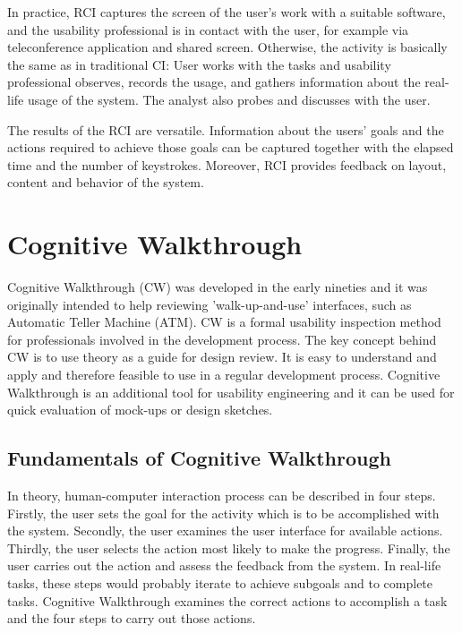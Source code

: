 \documentclass[12pt,a4paper,oneside,pdftex]{report}
\begin{document}
In practice, RCI captures the screen of the user's work with a suitable software, and the usability professional is in contact with the user, for example via teleconference application and shared screen. Otherwise, the activity is basically the same as in traditional CI: User works with the tasks and usability professional observes, records the usage, and gathers information about the real-life usage of the system. The analyst also probes and discusses with the user. \citep{RefWorks:32}

The results of the RCI are versatile. Information about the users' goals and the actions required to achieve those goals can be captured together with the elapsed time and the number of keystrokes. Moreover, RCI provides feedback on layout, content and behavior of the system. \citep{RefWorks:32}
 
\section{Cognitive Walkthrough}
\label{sec:cognitivewalkthrough}

Cognitive Walkthrough (CW) was developed in the early nineties and it was originally intended to help reviewing 'walk-up-and-use' interfaces, such as Automatic Teller Machine (ATM). CW is a formal usability inspection method for professionals involved in the development process. The key concept behind CW is to use theory as a guide for design review. It is easy to understand and apply and therefore feasible to use in a regular development process. \citep{RefWorks:19, RefWorks:18} Cognitive Walkthrough is an additional tool for usability engineering and it can be used for quick evaluation of mock-ups or design sketches. \citep{RefWorks:34}

\subsection{Fundamentals of Cognitive Walkthrough}

In theory, human-computer interaction process can be described in four steps. Firstly, the user sets the goal for the activity which is to be accomplished with the system. Secondly, the user examines the user interface for available actions. Thirdly, the user selects the action most likely to make the progress. Finally, the user carries out the action and assess the feedback from the system. In real-life tasks, these steps would probably iterate to achieve subgoals and to complete tasks. Cognitive Walkthrough examines the correct actions to accomplish a task and the four steps to carry out those actions. \citep{RefWorks:34}
\end{document}
